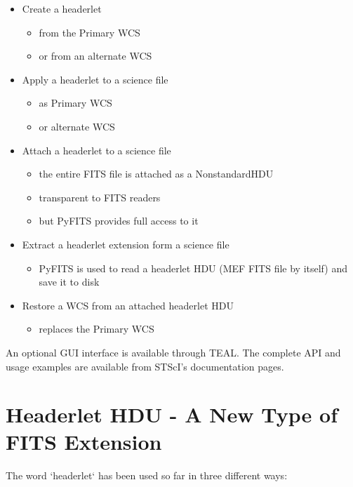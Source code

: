 \begin{itemize}
\item Create a headerlet
\begin{itemize}
  \item from the Primary WCS
  \item or from an alternate WCS
\end{itemize}
\item Apply a headerlet to a science file
\begin{itemize}
  \item as Primary WCS
  \item or alternate WCS
\end{itemize}
\item Attach a headerlet to a science file
\begin{itemize}
  \item the entire FITS file is attached as a NonstandardHDU
  \item transparent to FITS readers
  \item but PyFITS provides full access to it
\end{itemize}
\item Extract a headerlet extension form a science file
\begin{itemize}
  \item {}PyFITS is used to read a headerlet HDU (MEF FITS file by itself) and save it to disk
\end{itemize}
\item Restore a WCS from an attached headerlet HDU
\begin{itemize}
  \item replaces the Primary WCS
\end{itemize}
\end{itemize}

An optional GUI interface is available through TEAL. The complete API and usage examples are available from STScI's documentation pages.

\section{Headerlet HDU - A New Type of FITS Extension}
The word `headerlet` has been used so far in three different ways:

